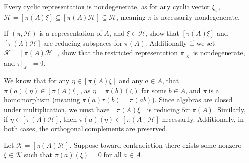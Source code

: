 \documentclass[10pt]{mypackage}
\begin{document}
Every cyclic representation is nondegenerate, as for any cyclic vector $\xi_{\pi}$, $\mathcal{H} = \left[\pi(A)\xi\right]\subseteq \left[\pi(A)\mathcal{H}\right]\subseteq \mathcal{H}$, meaning $\pi$ is necessarily nondegenerate.
\begin{exercise}
  If $\left(\pi,\mathcal{H}\right)$ is a representation of $A$, and $\xi\in \mathcal{H}$, show that $\left[\pi(A)\xi\right]$ and $\left[\pi(A)\mathcal{H}\right]$ are reducing subspaces for $\pi(A)$. Additionally, if we set $\mathcal{K} = \left[\pi(A)\mathcal{H}\right]$, show that the restricted representation $\pi|_{\mathcal{K}}$ is nondegenerate, and $\pi|_{\mathcal{K}^{\perp}} = 0$.
\end{exercise}
\begin{solution}
  We know that for any $\eta\in \left[\pi(A)\xi\right]$ and any $a\in A$, that $\pi(a)\left(\eta\right)\in \left[\pi(A)\xi\right]$, as $\eta = \pi(b)\left(\xi\right)$ for some $b\in A$, and $\pi$ is a homomorphism (meaning $\pi(a)\pi(b) = \pi(ab)$). Since algebras are closed under multiplication, we must have $\left[\pi(A)\xi\right]$ is reducing for $\pi(A)$. Similarly, if $\eta\in \left[\pi(A)\mathcal{H}\right]$, then $\pi(a)\left(\eta\right)\in \left[\pi(A)\mathcal{H}\right]$ necessarily. Additionally, in both cases, the orthogonal complements are preserved.\newline

  Let $\mathcal{K} = \left[\pi(A)\mathcal{H}\right]$. Suppose toward contradiction there exists some nonzero $\xi\in \mathcal{K}$ such that $\pi(a)\left(\xi\right) = 0$ for all $a\in A$. 
\end{solution}
\end{document}
